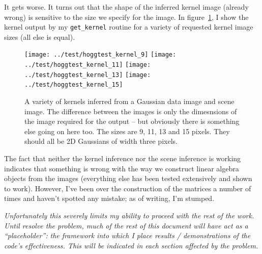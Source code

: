 \documentclass[letterpaper, 11pt]{article}
\begin{document}
It gets worse. It turns out that the shape of the inferred kernel image (already wrong) is sensitive to the size we specify for the image. In figure~\ref{fig:inferred_kernel_sizes}, I show the kernel output by my \texttt{get\_kernel} routine for a variety of requested kernel image sizes (all else is equal).
\begin{figure}
	\centering
	\def\scale{2}
	\texttt{[image: ../test/hoggtest\_kernel\_9]}
	\texttt{[image: ../test/hoggtest\_kernel\_11]}
	\texttt{[image: ../test/hoggtest\_kernel\_13]}	
	\texttt{[image: ../test/hoggtest\_kernel\_15]}
	\caption{A variety of kernels inferred from a Gaussian data image and scene image. The difference between the images is only the dimesnsions of the image required for the output -- but obviously there is something else going on here too. The sizes are 9, 11, 13 and 15 pixels. They should all be 2D Gaussians of width three pixels.}
	\label{fig:inferred_kernel_sizes}
\end{figure}

The fact that neither the kernel inference nor the scene inference is working indicates that something is wrong with the way we construct linear algebra objects from the images (everything else has been tested extensively and shown to work). However, I've been over the construction of the matrices a number of times and haven't spotted any mistake; as of writing, I'm stumped.

{\it Unfortunately this severely limits my ability to proceed with the rest of the work. Until resolve the problem, much of the rest of this document will have act as a ``placeholder'': the framework into which I place results / demonstrations of the code's effectiveness. This will be indicated in each section affected by the problem.}
\end{document}
